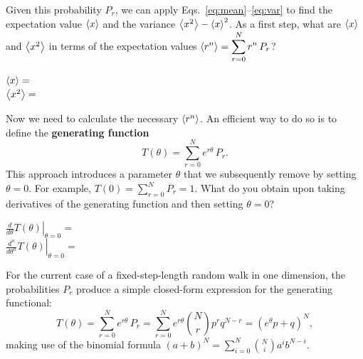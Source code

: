 Given this probability $P_r$, we can apply Eqs.~\ref{eq:mean}--\ref{eq:var} to find the expectation value $\left\langle x \right\rangle$ and the variance $\left\langle x^2 \right\rangle - \left\langle x \right\rangle^2$.
As a first step, what are $\left\langle x \right\rangle$ and $\left\langle x^2 \right\rangle$ in terms of the expectation values $\displaystyle \left\langle r^n \right\rangle = \sum_{r = 0}^N r^n \, P_r$?
\begin{mdframed}
  $\left\langle x \right\rangle   = $ \\[50 pt]
  $\left\langle x^2 \right\rangle = $ \\[50 pt]
\end{mdframed}
Now we need to calculate the necessary $\left\langle r^n \right\rangle$.
An efficient way to do so is to define the \textbf{generating function}
\begin{equation}
  T(\theta) = \sum_{r = 0}^N e^{r \theta} \, P_r.
\end{equation}
This approach introduces a parameter $\theta$ that we subsequently remove by setting $\theta = 0$.
For example, $T(0) = \sum_{r = 0}^N P_r = 1$.
What do you obtain upon taking derivatives of the generating function and then setting $\theta = 0$?
\begin{mdframed}
  $\displaystyle \left.\frac{d}{d\theta} T(\theta)\right|_{\theta = 0} = $ \\[50 pt]
  $\displaystyle \left.\frac{d^n}{d\theta^n} T(\theta)\right|_{\theta = 0} = $ \\[50 pt]
\end{mdframed}

For the current case of a fixed-step-length random walk in one dimension, the probabilities $P_r$ produce a simple closed-form expression for the generating functional:
\begin{equation}
  \label{eq:gen_func}
  T(\theta) = \sum_{r = 0}^N e^{r \theta} \, P_r = \sum_{r = 0}^N e^{r \theta} \binom{N}{r} p^r q^{N - r} = \left(e^{\theta} p + q\right)^N,
\end{equation}
making use of the binomial formula $\left(a + b\right)^N = \sum_{i = 0}^N \binom{N}{i} a^i b^{N - i}$.


